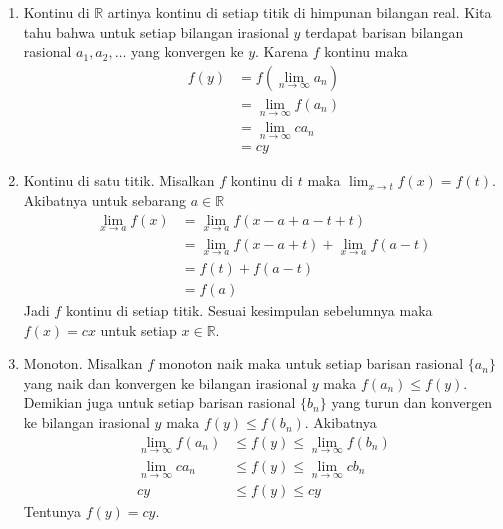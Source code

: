 \documentclass{article}
\begin{document}
\begin{enumerate}
\item Kontinu di $\mathbb{R}$ artinya kontinu di setiap titik di himpunan bilangan real. Kita tahu bahwa untuk setiap bilangan irasional $y$ terdapat barisan bilangan rasional $a_1, a_2, \dots$ yang konvergen ke $y$. Karena $f$ kontinu maka
\begin{align*}
f(y) &= f\left(\lim_{n \rightarrow \infty} a_n\right) \\
&= \lim_{n \rightarrow \infty} f(a_n) \\
&= \lim_{n \rightarrow \infty} c a_n \\
&= cy
\end{align*}
\item Kontinu di satu titik. Misalkan $f$ kontinu di $t$ maka $\lim_{x \rightarrow t} f(x) = f(t)$. Akibatnya untuk sebarang $a \in \mathbb{R}$
\begin{align*}
\lim_{x \rightarrow a} f(x) &= \lim_{x \rightarrow a} f(x-a+a-t+t) \\
&= \lim_{x \rightarrow a} f(x-a+t) + \lim_{x \rightarrow a} f(a-t) \\
&= f(t) + f(a-t) \\
&= f(a)
\end{align*}
Jadi $f$ kontinu di setiap titik. Sesuai kesimpulan sebelumnya maka $f(x) = cx$ untuk setiap $x \in \mathbb{R}$.
\item Monoton. Misalkan $f$ monoton naik maka untuk setiap barisan rasional $\{a_n\}$ yang naik dan konvergen ke bilangan irasional $y$ maka $f(a_n) \le f(y)$. Demikian juga untuk setiap barisan rasional $\{b_n\}$ yang turun dan konvergen ke bilangan irasional $y$ maka $f(y) \le f(b_n)$. Akibatnya
\begin{align*}
\lim_{n \rightarrow \infty} f(a_n) &\le f(y) \le \lim_{n \rightarrow \infty} f(b_n) \\
\lim_{n \rightarrow \infty} c a_n &\le f(y) \le \lim_{n \rightarrow \infty} c b_n \\
cy &\le f(y) \le cy
\end{align*}
Tentunya $f(y) = cy$.
\end{enumerate}
\end{document}
